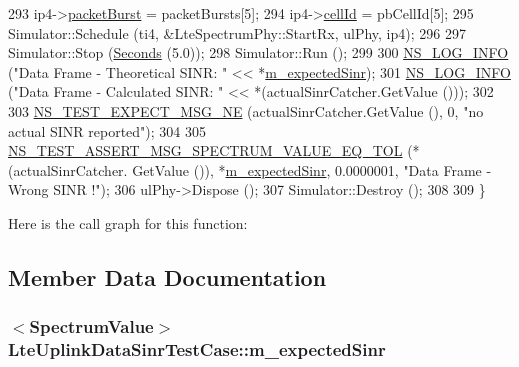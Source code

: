 \begin{DoxyCode}
293   ip4->\hyperlink{structns3_1_1LteSpectrumSignalParametersDataFrame_add8e31df8ae232dec2558cbb733c311e}{packetBurst} = packetBursts[5];
294   ip4->\hyperlink{structns3_1_1LteSpectrumSignalParametersDataFrame_aed33b300ea4ff7a70f6d42c9ea2226ea}{cellId} = pbCellId[5];
295   Simulator::Schedule (ti4, &LteSpectrumPhy::StartRx, ulPhy, ip4);
296 
297   Simulator::Stop (\hyperlink{group__timecivil_ga33c34b816f8ff6628e33d5c8e9713b9e}{Seconds} (5.0));
298   Simulator::Run ();
299 
300   \hyperlink{group__logging_gafbd73ee2cf9f26b319f49086d8e860fb}{NS\_LOG\_INFO} (\textcolor{stringliteral}{"Data Frame - Theoretical SINR: "} << *\hyperlink{classLteUplinkDataSinrTestCase_adca6c0366fbf143b1cfc0f92c591bc39}{m\_expectedSinr});
301   \hyperlink{group__logging_gafbd73ee2cf9f26b319f49086d8e860fb}{NS\_LOG\_INFO} (\textcolor{stringliteral}{"Data Frame - Calculated SINR: "} << *(actualSinrCatcher.GetValue ()));
302 
303   \hyperlink{group__testing_ga6d4b162d26b8a930115b97dd5f3d9ed9}{NS\_TEST\_EXPECT\_MSG\_NE} (actualSinrCatcher.GetValue (), 0, \textcolor{stringliteral}{"no actual SINR reported"});
304 
305   \hyperlink{spectrum-test_8h_ac37d86c7027e04c671885b0f087ab7e0}{NS\_TEST\_ASSERT\_MSG\_SPECTRUM\_VALUE\_EQ\_TOL} (*(actualSinrCatcher.
      GetValue ()), *\hyperlink{classLteUplinkDataSinrTestCase_adca6c0366fbf143b1cfc0f92c591bc39}{m\_expectedSinr}, 0.0000001, \textcolor{stringliteral}{"Data Frame - Wrong SINR !"});
306   ulPhy->Dispose ();
307   Simulator::Destroy ();
308   
309 \}
\end{DoxyCode}


Here is the call graph for this function\+:




\subsection{Member Data Documentation}
\subsubsection[{\texorpdfstring{m\+\_\+expected\+Sinr}{m_expectedSinr}}]{$<${\bf Spectrum\+Value}$>$ Lte\+Uplink\+Data\+Sinr\+Test\+Case\+::m\+\_\+expected\+Sinr\hspace{0.3cm}{\ttfamily [private]}}\hypertarget{classLteUplinkDataSinrTestCase_adca6c0366fbf143b1cfc0f92c591bc39}{}\label{classLteUplinkDataSinrTestCase_adca6c0366fbf143b1cfc0f92c591bc39}
